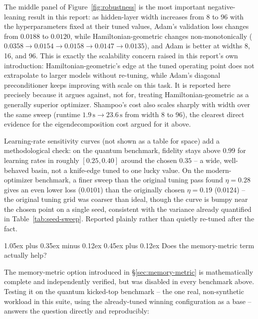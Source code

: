 \documentclass[10pt,twocolumn]{article}
\makeatletter
\renewcommand\subsection{\@startsection{subsection}{2}{0pt}%
  {1.05ex plus 0.35ex minus 0.12ex}%
  {0.45ex plus 0.12ex}%
  {\normalsize\bfseries}}
\makeatother
\begin{document}
The middle panel of Figure~\ref{fig:robustness} is the most important
negative-leaning result in this report: as hidden-layer width increases from
8 to 96 with the hyperparameters fixed at their tuned values, Adam's
validation loss changes from $0.0188$ to $0.0120$, while
Hamiltonian-geometric changes non-monotonically
($0.0358\to0.0154\to0.0158\to0.0147\to0.0135$), and Adam is better at widths
8, 16, and 96. This is exactly the scalability concern
raised in this report's own introduction: Hamiltonian-geometric's edge at the
tuned operating point does not extrapolate to larger models without
re-tuning, while Adam's diagonal preconditioner keeps improving with scale on
this task. It is reported here precisely because it argues against, not for,
treating Hamiltonian-geometric as a generally superior optimizer. Shampoo's
cost also scales sharply with width over the same sweep (runtime
$1.9\,\mathrm{s}\to23.6\,\mathrm{s}$ from width 8 to 96), the clearest direct evidence
for the eigendecomposition cost argued for it above.

Learning-rate sensitivity curves (not shown as a table for space) add a
methodological check: on the quantum benchmark, fidelity stays above $0.99$
for learning rates in roughly $[0.25, 0.40]$ around the chosen $0.35$ -- a
wide, well-behaved basin, not a knife-edge tuned to one lucky value. On the
modern-optimizer benchmark, a finer sweep than the original tuning pass found
$\eta=0.28$ gives an even lower loss ($0.0101$) than the originally chosen
$\eta=0.19$ ($0.0124$) -- the original tuning grid was coarser than ideal,
though the curve is bumpy near the chosen point on a single seed, consistent
with the variance already quantified in Table~\ref{tab:seed-sweep}. Reported
plainly rather than quietly re-tuned after the fact.

\subsection{Does the memory-metric term actually help?}

The memory-metric option introduced in \S\ref{sec:memory-metric} is
mathematically complete and independently verified, but was disabled in every
benchmark above. Testing it on
the quantum kicked-top benchmark -- the one real, non-synthetic workload in
this suite, using the already-tuned winning configuration as a base --
answers the question directly and reproducibly:
\end{document}

